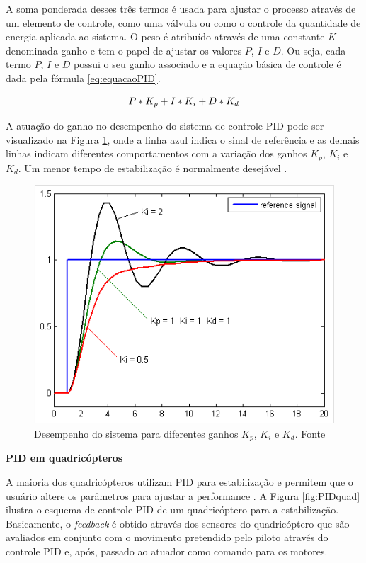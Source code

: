 \documentclass[a4paper, 12pt]{article}
\begin{document}
A soma ponderada desses três termos é usada para ajustar o processo através de um elemento de controle, como uma válvula ou como o controle da quantidade de energia aplicada ao sistema. O peso é atribuído através de uma constante $K$ denominada ganho e tem o papel de ajustar os valores $P$, $I$ e $D$. Ou seja, cada termo $P$, $I$ e $D$ possui o seu ganho associado e a equação básica de controle é dada pela fórmula \ref{eq:equacaoPID}. 

\begin{equation}
	\centering
		P*K_p + I*K_i + D*K_d	
	\label{eq:equacaoPID}
\end{equation}

A atuação do ganho no desempenho do sistema de controle PID pode ser visualizado na Figura \ref{fig:ganhoPID}, onde a linha azul indica o sinal de referência e as demais linhas indicam diferentes comportamentos com a variação dos ganhos $K_p$, $K_i$ e $K_d$. Um menor tempo de estabilização é normalmente desejável \cite{Kingdom}.  

\begin{figure}[h]
	\centering
		\includegraphics[scale=0.5]{img/ganho_PID.png}
	\caption{Desempenho do sistema para diferentes ganhos $K_p$, $K_i$ e $K_d$. Fonte \cite{Kingdom}}
	\label{fig:ganhoPID}
\end{figure}
 
\noindent\textbf{PID em quadricópteros}

A maioria dos quadricópteros utilizam PID para estabilização e permitem que o usuário altere os parâmetros para ajustar a performance \cite{Liang}. A Figura \ref{fig:PIDquad} ilustra o esquema de controle PID de um quadricóptero para a estabilização. Basicamente, o \textit{feedback} é obtido através dos sensores do quadricóptero que são avaliados em conjunto com o movimento pretendido pelo piloto através do controle PID e, após, passado ao atuador como comando para os motores. 
\end{document}
